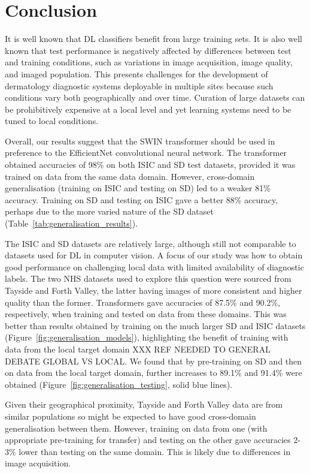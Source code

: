 \section{Conclusion}
\label{sec:generalisation_conclusion}
It is well known that DL classifiers benefit from large training sets. It is also well known that test performance is negatively affected by differences between test and training conditions, such as variations in image acquisition, image quality, and imaged population. This presents challenges for the development of dermatology diagnostic systems deployable in multiple sites because such conditions vary both geographically and over time. Curation of large datasets can be prohibitively expensive at a local level and yet learning systems need to be tuned to local conditions. 

Overall, our results suggest that the SWIN transformer should be used in preference to the EfficientNet convolutional neural network. The transformer obtained accuracies of 98\% on both ISIC and SD test datasets, provided it was trained on data from the same data domain. However, cross-domain generalisation (training on ISIC and testing on SD) led to a weaker 81\% accuracy. Training on SD and testing on ISIC gave a better 88\% accuracy, perhaps due to the more varied nature of the SD dataset (Table~\ref{tab:generalisation_results}).

The ISIC and SD datasets are relatively large, although still not comparable to datasets used for DL in computer vision. A focus of our study was how to obtain good performance on challenging local data with limited availability of diagnostic labels. The two NHS datasets used to explore this question were sourced from Tayside and Forth Valley, the latter having images of more consistent and higher quality than the former. Transformers gave accuracies of 87.5\% and 90.2\%, respectively, when training and tested on data from these domains. This was better than results obtained by training on the much larger SD and ISIC datasets (Figure~\ref{fig:generalisation_models}), highlighting the benefit of training with data from the local target domain XXX REF NEEDED TO GENERAL DEBATE GLOBAL VS LOCAL. We found that by pre-training on SD and then on data from the local target domain, further increases to 89.1\% and 91.4\% were obtained (Figure~\ref{fig:generalisation_testing}, solid blue lines). 

Given their geographical proximity, Tayside and Forth Valley data are from similar populations so might be expected to have good cross-domain generalisation between them. However, training on data from one (with appropriate pre-training for transfer) and testing on the other gave accuracies 2-3\% lower than testing on the same domain. This is likely due to differences in image acquisition.

